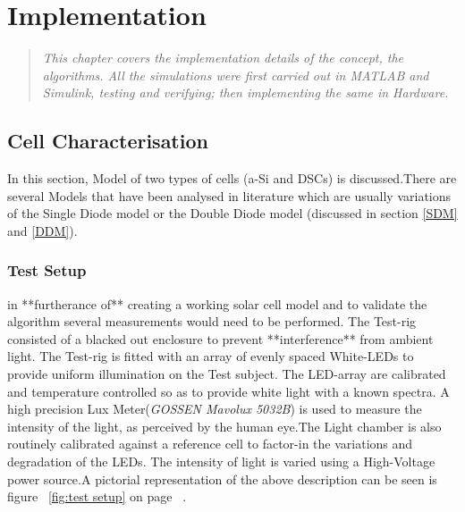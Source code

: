\chapter{Implementation}
\begin{quote} 
\it This chapter covers the implementation details of the concept, the algorithms. All the simulations were first carried out in MATLAB{\textregistered} and Simulink{\textregistered}, testing and verifying; then implementing the same in Hardware.
\end{quote}


\section{Cell Characterisation}
In this section, Model of two types of cells (\ac{a-Si} and \ac{DSCs}) is discussed.There are several Models that have been analysed in literature which are usually variations of the Single Diode model or the Double Diode model (discussed in section \ref{SDM} and \ref{DDM}).
 
\subsection{Test Setup}
in **furtherance of** creating a working solar cell model and to validate the algorithm several measurements would need to be performed. The Test-rig consisted of a blacked out enclosure to prevent **interference** from ambient light. The Test-rig is fitted with an array of evenly spaced White-\ac{LED}s to provide uniform illumination on the Test subject. The \ac{LED}-array are calibrated and temperature controlled so as to provide white light with a known spectra. A high precision Lux Meter(\textit{GOSSEN Mavolux 5032B}) is used to measure the  intensity of the light, as perceived by the human eye.The Light chamber is also routinely calibrated against a reference cell to factor-in the variations and degradation of the \ac{LED}s. The intensity of light is varied using a High-Voltage power source.A pictorial representation of the above description can be seen is figure  ~\ref{fig:test setup} on page ~\pageref{fig:test setup}. \\

